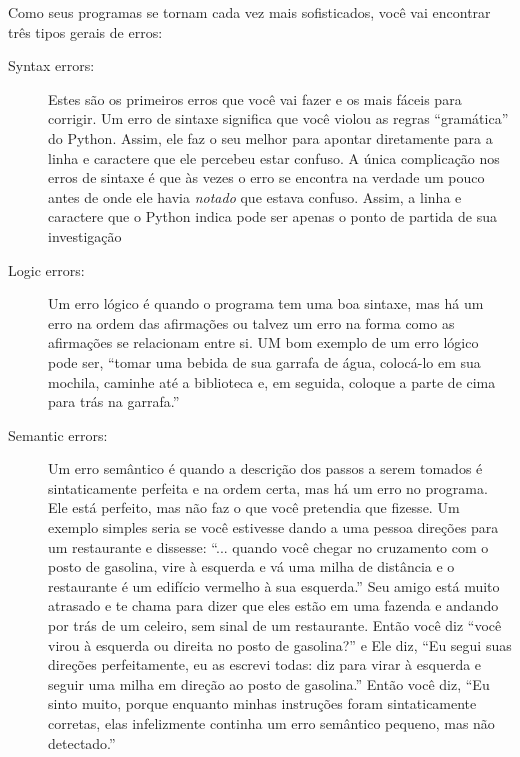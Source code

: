 Como seus programas se tornam cada vez mais sofisticados, você vai encontrar três 
tipos gerais de erros:

\begin{description}

\item[Syntax errors:] Estes são os primeiros erros que você vai fazer e os mais fáceis
para corrigir.  Um erro de sintaxe significa que você violou as regras ``gramática'' do Python. Assim, ele faz o seu melhor para apontar diretamente para a linha e caractere que ele percebeu estar confuso. A única complicação nos erros de sintaxe é que às vezes o erro se encontra na verdade um pouco antes de onde ele havia {\em notado} que estava confuso. Assim, a linha e caractere que o Python indica pode ser apenas o ponto de partida de sua investigação

\item[Logic errors:] Um erro lógico é quando o programa tem uma boa sintaxe, mas há um erro na ordem das afirmações ou talvez um erro na forma como as afirmações se relacionam entre si. UM bom exemplo de um erro lógico pode ser,  ``tomar uma bebida de sua garrafa de água, colocá-lo em sua mochila, caminhe até a biblioteca e, em seguida, coloque a parte de cima para trás na garrafa.''

\item[Semantic errors:]


Um erro semântico é quando a descrição dos passos a serem tomados é sintaticamente perfeita e na ordem certa, mas há um erro no programa. Ele está perfeito, mas não faz o que você pretendia que fizesse. Um exemplo simples seria
se você estivesse dando a uma pessoa direções para um restaurante e dissesse: ``... quando você chegar no cruzamento com o posto de gasolina, vire à esquerda e vá uma milha de distância e o restaurante é um edifício vermelho à sua esquerda.''  Seu amigo está muito atrasado e te chama para dizer que eles estão em uma fazenda e andando por trás de um celeiro, sem sinal de um restaurante.  
Então você diz ``você virou à esquerda ou direita no posto de gasolina?'' e 
Ele diz, ``Eu segui suas direções perfeitamente, eu as escrevi todas: diz para virar à esquerda e seguir uma milha em direção ao posto de gasolina.''  Então você diz, ``Eu sinto muito, porque enquanto minhas instruções foram sintaticamente corretas, elas infelizmente continha um erro semântico pequeno, mas não detectado.''

\end{description}

